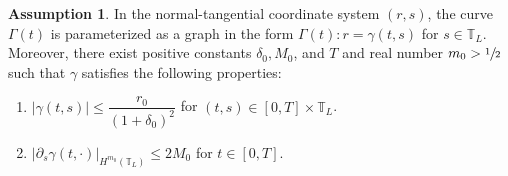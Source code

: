 \documentclass[JEP,XML,SOM,Unicode,NoFloatCountersInSection,published]{cedram}
\newenvironment{enumeratei}
{\bgroup\def\theenumi{\roman{enumi}}\def\theenumii{\arabic{enumii}}\begin{enumerate}}
{\end{enumerate}\egroup}
\newcommand{\itGamma}{\mathit{\Gamma}}
\theoremstyle{definition}
\newtheorem{assumption}[theorem]{Assumption}
\begin{document}
\begin{assumption}\label{ass:CL}
In the normal-tangential coordinate system $(r,s)$,
the curve $\itGamma(t)$ is parameterized as a graph in the form $\itGamma(t): r=\gamma(t,s)$ for $s\in\mathbb{T}_L$.
Moreover, there exist positive constants $\delta_0,M_0$, and $T$ and real number $m_0>\sfrac12$ such that $\gamma$ satisfies the following properties:
\begin{enumeratei}
\item\label{ass:CLi}
$|\gamma(t,s)| \leq \dfrac{r_0}{(1+\delta_0)^2}$ for $(t,s)\in[0,T]\times\mathbb{T}_L$.

\item\label{ass:CLii}
$|\partial_s\gamma(t,\cdot)|_{H^{m_0}(\mathbb{T}_L)} \leq 2 M_0$ for $t\in[0,T]$.
\end{enumeratei}
\end{assumption}
\end{document}
